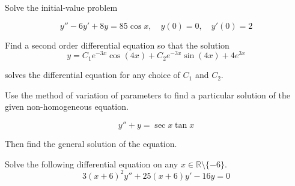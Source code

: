 \begin{mdframed}
    \vspace{-0.25cm}
    \hspace{-0.25cm}
    \begin{Exercise}
        Solve the initial-value problem

        \[
            y'' - 6y' + 8y = 85\cos x, \quad y(0) = 0, \quad y'(0) = 2
        \]
    \end{Exercise}

    \begin{Exercise}
        Find a second order differential equation so that the solution
        \[
            y = C_1 e^{-3x} \cos(4x) + C_2 e^{-3x} \sin(4x) + 4e^{3x}
        \]

        solves the differential equation for any choice of $C_1$ and $C_2$.
    \end{Exercise}

    \begin{Exercise}
        Use the method of variation of parameters to find a particular solution 
        of the given non-homogeneous equation. 
        
        \[
            y'' + y = \sec x \tan x
        \]
        
        Then find the general solution 
        of the equation.
    \end{Exercise}

    \begin{Exercise}
        Solve the following differential equation on any  
        $x \in \mathbb{R} \setminus \{ -6 \}$.
        \[
            3(x+6)^2y'' + 25(x+6)y' - 16y = 0
        \]
    \end{Exercise}
\end{mdframed}